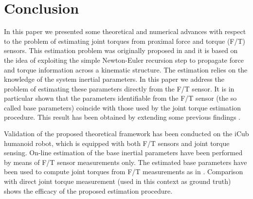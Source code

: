 \section{Conclusion} 
\label{sec:conclusion}
In this paper we presented some theoretical and numerical advances with respect to the problem of estimating joint torques from proximal force and torque (F/T) sensors. This estimation problem was originally proposed in \cite{Fumagalli2012} and it is based on the idea of exploiting the simple Newton-Euler recursion step to propagate force and torque information across a kinematic structure. The estimation relies on the knowledge of the system inertial parameters. In this paper we address the problem of estimating these parameters directly from the F/T sensor. It is in particular shown that the parameters identifiable from the  F/T sensor (the so called base parameters) coincide with those used by the joint torque estimation procedure. This result has been obtained by extending some previous findings \cite{ayusawa2013}. 

Validation of the proposed theoretical framework has been conducted on the iCub humanoid robot, which is equipped with both F/T sensors and joint torque sensing. On-line estimation of the base inertial parameters have been performed by means of F/T sensor measurements only. The estimated base parameters have been used to compute joint torques from F/T measurements as in \cite{Fumagalli2012}. Comparison with direct joint torque measurement (used in this context as ground truth) shows the efficacy of the proposed estimation procedure. 

